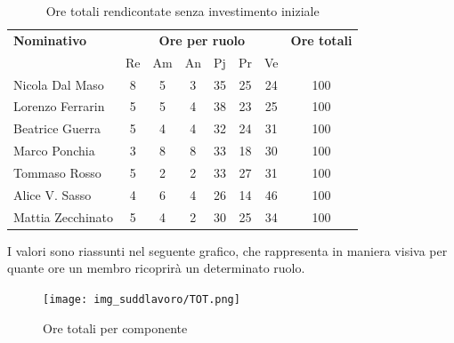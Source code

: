 \begin{table}[H]
	\centering
	\begin{tabular}{|l|c|c|c|c|c|c|c|}
		\hline
		\textbf{Nominativo} & 
		\multicolumn{6}{c|}{\textbf{Ore per ruolo}} & 
		\textbf{Ore totali} \\
		& Re & Am & An & Pj & Pr & Ve & \\
		\hline
		Nicola Dal Maso &8 &5 &3 &35 &25 &24 & 100 \\
		Lorenzo Ferrarin &5 &5 &4 &38 &23 &25 & 100 \\
		Beatrice Guerra &5 &4 &4 &32 &24 &31 & 100 \\
		Marco Ponchia &3 &8 &8 &33 &18 &30 & 100 \\
		Tommaso Rosso &5 &2 &2 &33 &27 &31 & 100 \\
		Alice V. Sasso &4 &6 &4 &26 &14 &46 & 100 \\
		Mattia Zecchinato &5 &4 &2 &30 &25 &34 & 100 \\
		\hline
	\end{tabular}
	\caption{Ore totali rendicontate senza investimento iniziale}
\end{table}
I valori sono riassunti nel seguente grafico, che rappresenta in maniera visiva per quante ore un membro ricoprirà un determinato ruolo.
\begin{figure}[H]
	\centering
	\texttt{[image: img\_suddlavoro/TOT.png]}
	\caption{Ore totali per componente}
\end{figure}





